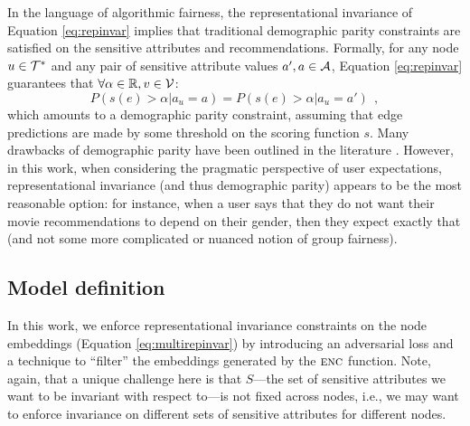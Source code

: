 In the language of algorithmic fairness, the representational invariance of Equation \eqref{eq:repinvar} implies that traditional demographic parity constraints are satisfied on the sensitive attributes and recommendations.
Formally, for any node $u \in \mathcal{T}^*$ and any pair of sensitive attribute values $a', a \in \mathcal{A}$, Equation \ref{eq:repinvar} guarantees that $\forall \alpha \in \mathbb{R}, v \in \mathcal{V}$:
\begin{equation}
    P( s(e) > \alpha | a_u = a) =  P( s(e) > \alpha | a_u = a') \:\: ,
\end{equation}
which amounts to a demographic parity constraint, assuming that edge predictions are made by some threshold on the scoring function $s$.
Many drawbacks of demographic parity have been outlined in the literature \cite{gajane2017formalizing}.
However, in this work, when considering the pragmatic perspective of user expectations, representational invariance (and thus demographic parity) appears to be the most reasonable option: for instance, when a user says that they do not want their movie recommendations to depend on their gender, then they expect exactly that (and not some more complicated or nuanced notion of group fairness).  


\subsection{Model definition}

In this work, we enforce representational invariance constraints on the node embeddings (Equation \ref{eq:multirepinvar}) by introducing an adversarial loss and a technique to ``filter'' the embeddings generated by the $\textsc{enc}$ function.
Note, again, that a unique challenge here is that $S$---the set of sensitive attributes we want to be invariant with respect to---is not  fixed across nodes, i.e., we may want to enforce invariance on different sets of sensitive attributes for different nodes. 

